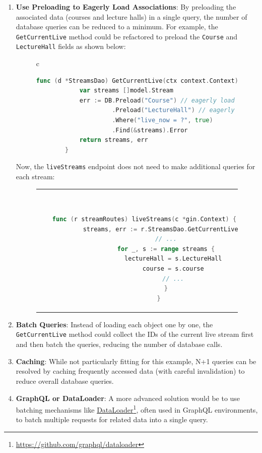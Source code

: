 \begin{enumerate}

\item \textbf{Use Preloading to Eagerly Load Associations}: By preloading the associated data (courses and lecture halls) in a single query, the number of database queries can be reduced to a minimum. For example, the \texttt{GetCurrentLive} method could be refactored to preload the \texttt{Course} and \texttt{LectureHall} fields as shown below:

    \begin{figure}[htpb]
      \begin{tabular}{c}
      \ \small \begin{lstlisting}[language=Go]
        func (d *StreamsDao) GetCurrentLive(ctx context.Context) ([]model.Stream, error) {
            var streams []model.Stream
            err := DB.Preload("Course") // eagerly load stream's course
                     .Preload("LectureHall") // eagerly load stream's lecture halls
                     .Where("live_now = ?", true)
                     .Find(&streams).Error
            return streams, err
        }
      \end{lstlisting}
      \end{tabular}
    \end{figure}

Now, the \texttt{liveStreams} endpoint does not need to make additional queries for each stream:
    
    \begin{figure}[htpb]
      \begin{tabular}{c}
      \ \small \begin{lstlisting}[language=Go]
        func (r streamRoutes) liveStreams(c *gin.Context) {
            streams, err := r.StreamsDao.GetCurrentLive(c)
            // ...
            for _, s := range streams {
                lectureHall = s.LectureHall
                course = s.course
                // ...
            }
        }
      \end{lstlisting}
      \end{tabular}
    \end{figure}

    \item \textbf{Batch Queries}: Instead of loading each object one by one, the \texttt{GetCurrentLive} method could collect the IDs of the current live stream first and then batch the queries, reducing the number of database calls.

    \item \textbf{Caching}: While not particularly fitting for this example, N+1 queries can be resolved by caching frequently accessed data (with careful invalidation) to reduce overall database queries.

    \item \textbf{GraphQL or DataLoader}: A more advanced solution would be to use batching mechanisms like \href{https://github.com/graphql/dataloader}{DataLoader}\footnote{\url{https://github.com/graphql/dataloader}}, often used in GraphQL environments, to batch multiple requests for related data into a single query.
\end{enumerate}


